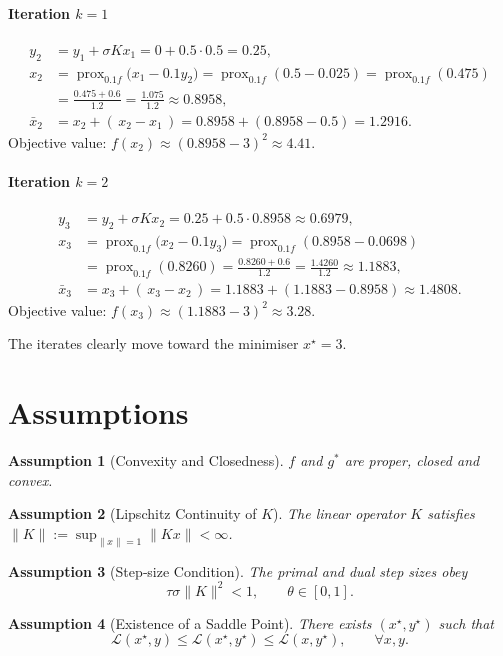 \documentclass[11pt]{article}
\newtheorem{assumption}{Assumption}[section]
\begin{document}
\paragraph{Iteration $k=1$}
\begin{align*}
y_{2}&=y_{1}+\sigma K x_{1}=0+0.5\cdot0.5=0.25,\\[4pt]
x_{2}&=\operatorname{prox}_{0.1 f}\!\bigl(x_{1}-0.1 y_{2}\bigr)
      =\operatorname{prox}_{0.1 f}(0.5-0.025)
      =\operatorname{prox}_{0.1 f}(0.475)\\
      &=\frac{0.475+0.6}{1.2}= \frac{1.075}{1.2}\approx0.8958,\\[4pt]
\bar{x}_{2}&=x_{2}+(\,x_{2}-x_{1}\,)=0.8958+(0.8958-0.5)=1.2916.
\end{align*}
Objective value: $f(x_{2})\approx(0.8958-3)^{2}\approx4.41$.

\paragraph{Iteration $k=2$}
\begin{align*}
y_{3}&=y_{2}+\sigma K x_{2}=0.25+0.5\cdot0.8958\approx0.6979,\\[4pt]
x_{3}&=\operatorname{prox}_{0.1 f}\!\bigl(x_{2}-0.1 y_{3}\bigr)
      =\operatorname{prox}_{0.1 f}(0.8958-0.0698)\\
      &=\operatorname{prox}_{0.1 f}(0.8260)
      =\frac{0.8260+0.6}{1.2}= \frac{1.4260}{1.2}\approx1.1883,\\[4pt]
\bar{x}_{3}&=x_{3}+(\,x_{3}-x_{2}\,)=1.1883+(1.1883-0.8958)\approx1.4808.
\end{align*}
Objective value: $f(x_{3})\approx(1.1883-3)^{2}\approx3.28$.

The iterates clearly move toward the minimiser $x^{\star}=3$.

\newpage
\section*{Assumptions}
\begin{assumption}[Convexity and Closedness]\label{ass:convex}
$f$ and $g^{*}$ are proper, closed and convex.
\end{assumption}
\begin{assumption}[Lipschitz Continuity of $K$]\label{ass:K}
The linear operator $K$ satisfies $\|K\|:=\sup_{\|x\|=1}\|Kx\|<\infty$.
\end{assumption}
\begin{assumption}[Step‑size Condition]\label{ass:stepsize}
The primal and dual step sizes obey
\[
\tau\sigma\|K\|^{2}<1,\qquad \theta\in[0,1].
\tag{5}
\]
\end{assumption}
\begin{assumption}[Existence of a Saddle Point]\label{ass:saddle}
There exists $(x^{\star},y^{\star})$ such that
\[
\mathcal{L}(x^{\star},y)\le \mathcal{L}(x^{\star},y^{\star})\le \mathcal{L}(x,y^{\star}),\qquad\forall x,y.
\tag{6}
\]
\end{assumption}
\end{document}
